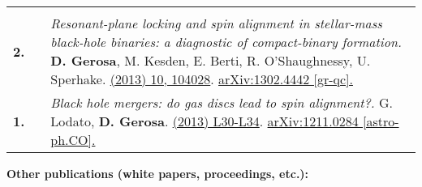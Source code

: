{\begin{longtable}{rp{0.3cm}p{15.8cm}}
\vspace{0.09cm}\\
%
\textbf{2.} & & \textit{Resonant-plane locking and spin alignment in stellar-mass black-hole binaries: a diagnostic of compact-binary formation.}
\newline{}
\textbf{D. Gerosa}, M. Kesden, E. Berti, R. O'Shaughnessy, U. Sperhake.
\newline{}
\href{http://dx.doi.org/10.1103/PhysRevD.87.104028}{\prd 87 (2013) 10, 104028}. \href{https://arxiv.org/abs/1302.4442}{arXiv:1302.4442 [gr-qc].}
\vspace{0.09cm}\\
%
\textbf{1.} & & \textit{Black hole mergers: do gas discs lead to spin alignment?.}
\newline{}
G. Lodato, \textbf{D. Gerosa}.
\newline{}
\href{http://dx.doi.org/10.1093/mnrasl/sls018}{\mnrasl 429 (2013) L30-L34}. \href{https://arxiv.org/abs/1211.0284}{arXiv:1211.0284 [astro-ph.CO].}
\vspace{0.09cm}\\
%
\end{longtable} }
\textcolor{color1}{\textbf{Other publications (white papers, proceedings, etc.):}}
\vspace{-0.5cm}

